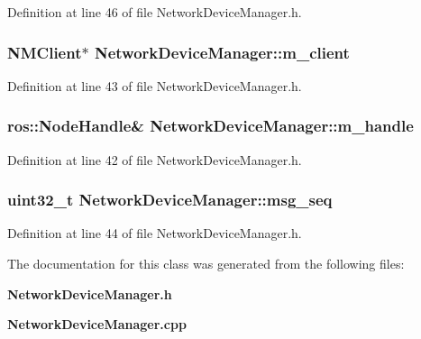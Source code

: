 \-Definition at line 46 of file \-Network\-Device\-Manager.\-h.

\subsubsection[{m\-\_\-client}]{\setlength{\rightskip}{0pt plus 5cm}\-N\-M\-Client$\ast$ {\bf \-Network\-Device\-Manager\-::m\-\_\-client}\hspace{0.3cm}{\ttfamily  [private]}}\label{classNetworkDeviceManager_a061bff79211ec2ab864c6d395bd967b8}


\-Definition at line 43 of file \-Network\-Device\-Manager.\-h.

\subsubsection[{m\-\_\-handle}]{\setlength{\rightskip}{0pt plus 5cm}ros\-::\-Node\-Handle\& {\bf \-Network\-Device\-Manager\-::m\-\_\-handle}\hspace{0.3cm}{\ttfamily  [private]}}\label{classNetworkDeviceManager_aafa94d7cb727d394dc3f3ec0c6bee8d6}


\-Definition at line 42 of file \-Network\-Device\-Manager.\-h.

\subsubsection[{msg\-\_\-seq}]{\setlength{\rightskip}{0pt plus 5cm}uint32\-\_\-t {\bf \-Network\-Device\-Manager\-::msg\-\_\-seq}\hspace{0.3cm}{\ttfamily  [private]}}\label{classNetworkDeviceManager_a5f095ff84d988fcb50047ebcf91c1c56}


\-Definition at line 44 of file \-Network\-Device\-Manager.\-h.



\-The documentation for this class was generated from the following files\-:\begin{DoxyCompactItemize}
\item 
{\bf \-Network\-Device\-Manager.\-h}\item 
{\bf \-Network\-Device\-Manager.\-cpp}\end{DoxyCompactItemize}

